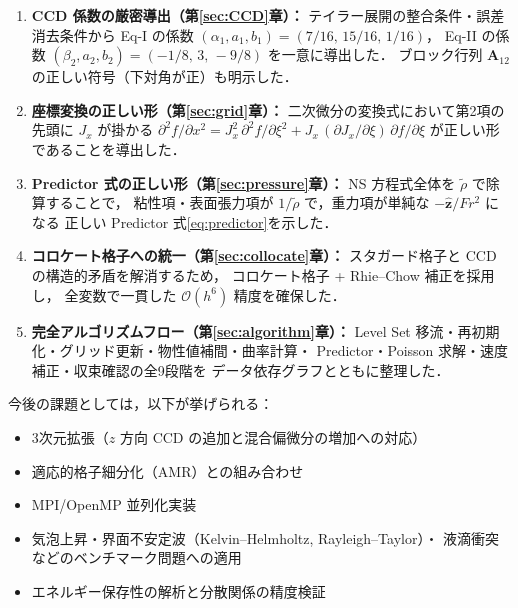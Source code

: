 \documentclass[12pt, a4paper, titlepage]{article}
\newcommand{\jp}[1]{{\normalfont\jpfont #1}}
\newcommand{\Ord}[1]{\mathcal{O}(#1)}
\begin{document}
\begin{enumerate}[leftmargin=2em, itemsep=4pt]

  \item \jp{\textbf{CCD 係数の厳密導出（第\ref{sec:CCD}章）：}
        テイラー展開の整合条件・誤差消去条件から Eq-I の係数
        $(\alpha_1,a_1,b_1)=(7/16,\,15/16,\,1/16)$，
        Eq-II の係数 $(\beta_2,a_2,b_2)=(-1/8,\,3,\,-9/8)$ を一意に導出した．
        ブロック行列 $\bm{A}_{12}$ の正しい符号（下対角が正）も明示した．}

  \item \jp{\textbf{座標変換の正しい形（第\ref{sec:grid}章）：}
        二次微分の変換式において第2項の先頭に $J_x$ が掛かる
        $\partial^2 f/\partial x^2 = J_x^2\,\partial^2 f/\partial\xi^2
        + J_x\,(\partial J_x/\partial\xi)\,\partial f/\partial\xi$
        が正しい形であることを導出した．}

  \item \jp{\textbf{Predictor 式の正しい形（第\ref{sec:pressure}章）：}
        NS 方程式全体を $\tilde\rho$ で除算することで，
        粘性項・表面張力項が $1/\tilde\rho$ で，重力項が単純な $-\hat{\bm{z}}/Fr^2$ になる
        正しい Predictor 式\eqref{eq:predictor}を示した．}

  \item \jp{\textbf{コロケート格子への統一（第\ref{sec:collocate}章）：}
        スタガード格子と CCD の構造的矛盾を解消するため，
        コロケート格子 + Rhie--Chow 補正を採用し，
        全変数で一貫した $\Ord{h^6}$ 精度を確保した．}

  \item \jp{\textbf{完全アルゴリズムフロー（第\ref{sec:algorithm}章）：}
        Level Set 移流・再初期化・グリッド更新・物性値補間・曲率計算・
        Predictor・Poisson 求解・速度補正・収束確認の全9段階を
        データ依存グラフとともに整理した．}

\end{enumerate}

\jp{今後の課題としては，以下が挙げられる：}
\begin{itemize}
  \item \jp{3次元拡張（$z$ 方向 CCD の追加と混合偏微分の増加への対応）}
  \item \jp{適応的格子細分化（AMR）との組み合わせ}
  \item \jp{MPI/OpenMP 並列化実装}
  \item \jp{気泡上昇・界面不安定波（Kelvin--Helmholtz, Rayleigh--Taylor）・
        液滴衝突などのベンチマーク問題への適用}
  \item \jp{エネルギー保存性の解析と分散関係の精度検証}
\end{itemize}
\end{document}

